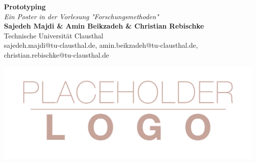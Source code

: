 \documentclass[a0,portrait]{a0poster}
\begin{document}


\begin{minipage}[b]{0.75\linewidth}
\veryHuge \color{Green} \textbf{Prototyping} \color{Black}\\ %
\Huge\textit{Ein Poster in der Vorlesung "Forschungsmethoden"}\\[2cm] %
    \huge \textbf{Sajedeh Majdi \& Amin Beikzadeh \& Christian Rebischke}\\[0.5cm] %
\huge Technische Universität Clausthal\\[0.4cm] %
\Large sajedeh.majdi@tu-clausthal.de, amin.beikzadeh@tu-clausthal.de, christian.rebischke@tu-clausthal.de\\
\end{minipage}
%
\begin{minipage}[b]{0.25\linewidth}
\includegraphics[width=20cm]{logo.png}\\
\end{minipage}

\vspace{1cm} %

\end{document}
